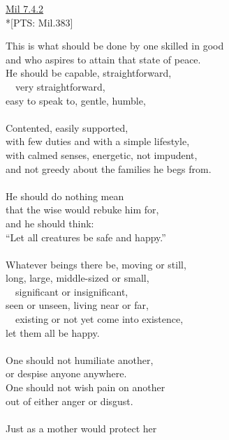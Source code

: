 \documentclass[10pt, openright]{book}
\begin{document}
\begin{flushright}
\href{https://suttacentral.net/mil7.4.2/en/tw_rhysdavids?reference=main/pts#pts-cs7}{Mil 7.4.2}\\

*[PTS: Mil.383]


\end{flushright}


\begin{itemize}


This is what should be done by one skilled in good \\ 
and who aspires to attain that state of peace. \\ 
He should be capable, straightforward, \\ 
  very straightforward, \\ 
easy to speak to, gentle, humble, \\ 
 \\ 
Contented, easily supported, \\ 
with few duties and with a simple lifestyle, \\ 
with calmed senses, energetic, not impudent, \\ 
and not greedy about the families he begs from. \\ 
 \\ 
He should do nothing mean \\ 
that the wise would rebuke him for, \\ 
and he should think: \\ 
“Let all creatures be safe and happy.” \\ 
 \\ 
Whatever beings there be, moving or still, \\ 
long, large, middle-sized or small, \\ 
  significant or insignificant, \\ 
seen or unseen, living near or far, \\ 
  existing or not yet come into existence, \\ 
let them all be happy. \\ 
 \\ 
One should not humiliate another, \\ 
or despise anyone anywhere. \\ 
One should not wish pain on another \\ 
out of either anger or disgust. \\ 
 \\ 
Just as a mother would protect her \\ 

\end{itemize}
\end{document}
